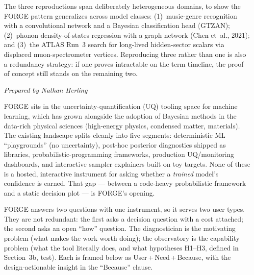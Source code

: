 \documentclass[11pt]{article}
\newcommand{\preparedby}{%
  \par\nobreak\vspace{-6pt}%
  {\footnotesize\itshape\color{forgemute}Prepared by Nathan Herling}%
  \par\vspace{4pt}}
\begin{document}
The three reproductions span deliberately heterogeneous domains, to show the FORGE pattern generalizes across model classes: (1)~music-genre recognition with a convolutional network and a Bayesian classification head (GTZAN); (2)~phonon density-of-states regression with a graph network (Chen et~al., 2021); and (3)~the ATLAS Run~3 search for long-lived hidden-sector scalars via displaced muon-spectrometer vertices. Reproducing three rather than one is also a redundancy strategy: if one proves intractable on the term timeline, the proof of concept still stands on the remaining two.

\preparedby

FORGE sits in the uncertainty-quantification (UQ) tooling space for machine learning, which has grown alongside the adoption of Bayesian methods in the data-rich physical sciences (high-energy physics, condensed matter, materials). The existing landscape splits cleanly into five segments: deterministic ML ``playgrounds'' (no uncertainty), post-hoc posterior diagnostics shipped as libraries, probabilistic-programming frameworks, production UQ/monitoring dashboards, and interactive sampler explainers built on toy targets. None of these is a hosted, interactive instrument for asking whether a \emph{trained} model's confidence is earned. That gap --- between a code-heavy probabilistic framework and a static decision plot --- is FORGE's opening.

FORGE answers two questions with one instrument, so it serves two user types. They are not redundant: the first asks a decision question with a cost attached; the second asks an open ``how'' question. The diagnostician is the motivating problem (what makes the work worth doing); the observatory is the capability problem (what the tool literally does, and what hypotheses H1--H3, defined in Section~3b, test). Each is framed below as User\,+\,Need\,+\,Because, with the design-actionable insight in the ``Because'' clause.
\end{document}
